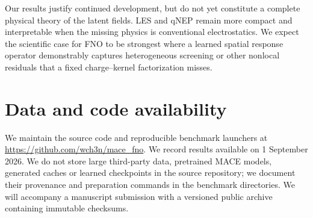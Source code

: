 \documentclass[11pt]{article}
\begin{document}
Our results justify continued development, but do not yet constitute a
complete physical theory of the latent fields. LES and qNEP remain more
compact and interpretable when the missing physics is conventional
electrostatics. We expect the scientific case for FNO to be strongest where a
learned spatial response operator demonstrably captures heterogeneous
screening or other nonlocal residuals that a fixed charge--kernel
factorization misses.

\section*{Data and code availability}

We maintain the source code and reproducible benchmark launchers at
\url{https://github.com/wch3n/mace_fno}. We record results available on
1 September 2026. We do not store large third-party data, pretrained MACE
models, generated caches or learned checkpoints in the source repository; we
document their provenance and preparation commands in the benchmark
directories. We will accompany a manuscript submission with a versioned
public archive containing immutable checksums.



\end{document}
